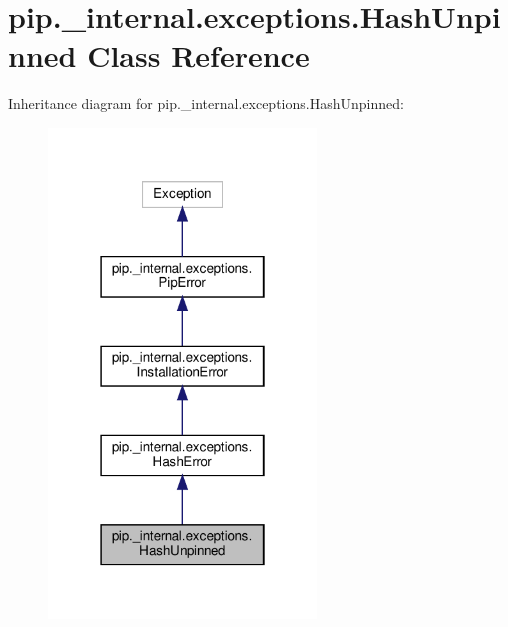\hypertarget{classpip_1_1__internal_1_1exceptions_1_1HashUnpinned}{}\section{pip.\+\_\+internal.\+exceptions.\+Hash\+Unpinned Class Reference}
\label{classpip_1_1__internal_1_1exceptions_1_1HashUnpinned}


Inheritance diagram for pip.\+\_\+internal.\+exceptions.\+Hash\+Unpinned\+:
\nopagebreak
\begin{figure}[H]
\begin{center}
\leavevmode
\includegraphics[width=202pt]{classpip_1_1__internal_1_1exceptions_1_1HashUnpinned__inherit__graph}
\end{center}
\end{figure}


